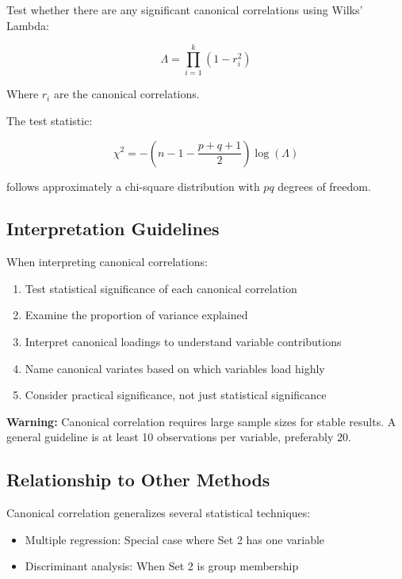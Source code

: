\documentclass[
]{article}
\begin{document}
Test whether there are any significant canonical correlations using
Wilks' Lambda:

\[\Lambda = \prod_{i = 1}^{k}\left( 1 - r_{i}^{2} \right)\]

Where \(r_{i}\) are the canonical correlations.

The test statistic:

\[\chi^{2} = - \left( n - 1 - \frac{p + q + 1}{2} \right)\log(\Lambda)\]

follows approximately a chi-square distribution with \(pq\) degrees of
freedom.

\textbf{ }

\subsection{Interpretation Guidelines}

When interpreting canonical correlations:

\begin{enumerate}
\item
  Test statistical significance of each canonical correlation
\item
  Examine the proportion of variance explained
\item
  Interpret canonical loadings to understand variable contributions
\item
  Name canonical variates based on which variables load highly
\item
  Consider practical significance, not just statistical significance
\end{enumerate}

\textbf{Warning: } Canonical correlation requires large sample sizes for
stable results. A general guideline is at least 10 observations per
variable, preferably 20.

\textbf{ }

\subsection{Relationship to Other Methods}

Canonical correlation generalizes several statistical techniques:

\begin{itemize}
\item
  Multiple regression: Special case where Set 2 has one variable
\item
  Discriminant analysis: When Set 2 is group membership
\end{itemize}
\end{document}
